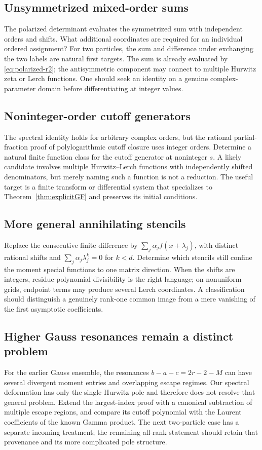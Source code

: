 \documentclass[11pt,letterpaper]{article}
\numberwithin{equation}{section}
\theoremstyle{definition}\newtheorem{definition}[theorem]{Definition}
\theoremstyle{remark}\newtheorem{remark}[theorem]{Remark}
\begin{document}
\subsection{Unsymmetrized mixed-order sums}
The polarized determinant evaluates the symmetrized sum with independent
orders and shifts. What additional coordinates are required for an
individual ordered assignment? For two particles, the sum and difference
under exchanging the two labels are natural first targets. The sum is
already evaluated by \eqref{eq:polarized-r2}; the antisymmetric component
may connect to multiple Hurwitz zeta or Lerch functions. One should seek
an identity on a genuine complex-parameter domain before differentiating
at integer values.

\subsection{Noninteger-order cutoff generators}
The spectral identity holds for arbitrary complex orders, but the rational
partial-fraction proof of polylogarithmic cutoff closure uses integer
orders. Determine a natural finite function class for the cutoff generator
at noninteger $s$. A likely candidate involves multiple Hurwitz--Lerch
functions with independently shifted denominators, but merely naming such
a function is not a reduction. The useful target is a finite transform
or differential system that specializes to Theorem~\ref{thm:explicitGF}
and preserves its initial conditions.

\subsection{More general annihilating stencils}
Replace the consecutive finite difference by
$\sum_j\alpha_j f(x+\lambda_j)$, with distinct rational shifts and
$\sum_j\alpha_j\lambda_j^k=0$ for $k<d$. Determine which stencils
still confine the moment special functions to one matrix direction.
When the shifts are integers, residue-polynomial divisibility is the
right language; on nonuniform grids, endpoint terms may produce several
Lerch coordinates. A classification should distinguish a genuinely
rank-one common image from a mere vanishing of the first asymptotic
coefficients.

\subsection{Higher Gauss resonances remain a distinct problem}
For the earlier Gauss ensemble, the resonances
$b-a-c=2r-2-M$ can have several divergent moment entries and overlapping
escape regimes. Our spectral deformation has only the single Hurwitz
pole and therefore does not resolve that general problem. Extend the
largest-index proof with a canonical subtraction of multiple escape
regions, and compare its cutoff polynomial with the Laurent coefficients
of the known Gamma product. The next two-particle case has a separate
incoming treatment; the remaining all-rank statement should retain that
provenance and its more complicated pole structure.
\end{document}
